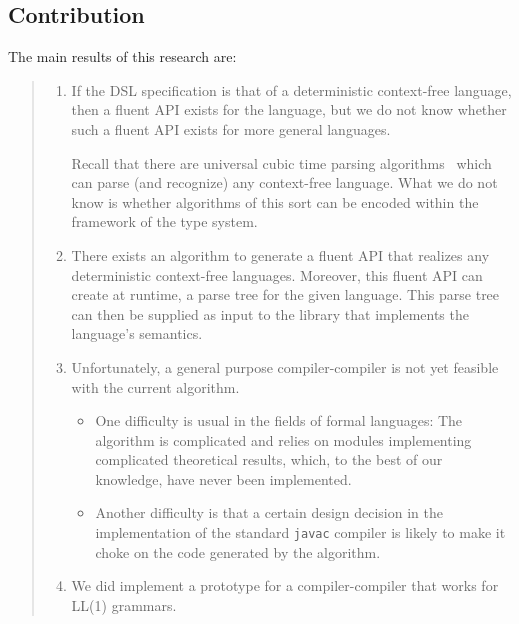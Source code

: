 \subsection{Contribution}
The main results of this research are:
\begin{quote}
  \begin{enumerate}
  \item If the DSL specification is that of a deterministic context-free
    language, then a fluent API exists for the language, but we do not know
    whether such a fluent API exists for more general languages.
  \par
  Recall that there are universal cubic time parsing
  algorithms~\cite{Cocke:1969,Earley:1970,Younger:1967} which can parse (and recognize) any
  context-free language. What we do not know is whether algorithms of this sort
  can be encoded within the framework of the \Java type system.
  \item
  There exists an algorithm to generate a fluent API that realizes any
  deterministic context-free languages. Moreover, this fluent API can create
  at runtime, a parse tree for the given language. This parse tree can then be
  supplied as input to the library that implements the language's semantics.
    \item
  Unfortunately, a general purpose compiler-compiler
  is not yet feasible with the current algorithm.
  \begin{itemize}
    \item One difficulty is usual in the fields of formal languages:
      The algorithm is complicated and relies on
      modules implementing complicated theoretical results, which, to the best of our
      knowledge, have never been implemented.
    \item Another difficulty is that a certain design decision in the
      implementation of the standard \texttt{javac} compiler is likely to make it choke on the
      \Java code generated by the algorithm.
  \end{itemize}
  \item
    We did implement a prototype for a compiler-compiler that works for LL(1) grammars.
  \end{enumerate}
\end{quote}

